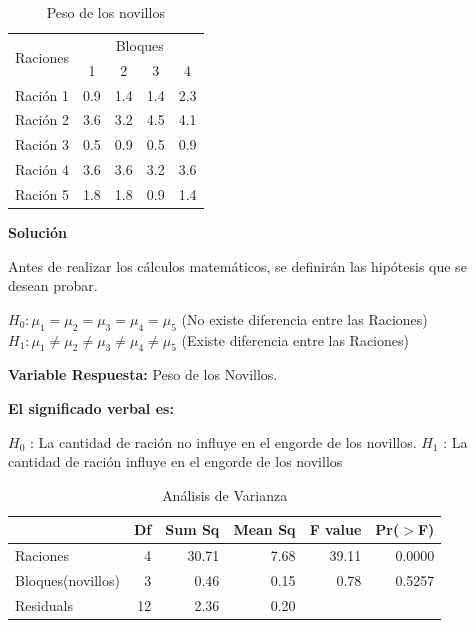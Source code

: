 \documentclass[12pt,letterpaper]{report}
\begin{document}
\begin{table}[htb]
\centering
\begin{tabular}{||c|c|c|c|c||}
\hline
\hline
\multirow{2}{*}{Raciones}  & \multicolumn{4}{|c||}{Bloques} \\
\cline{2-5}
     &1&2&3&4 \\
\hline
Ración 1 &0.9&1.4&1.4&2.3 \\
\hline
Ración 2 &3.6&3.2&4.5&4.1 \\
\hline
Ración 3 &0.5&0.9&0.5&0.9 \\
\hline
Ración 4 &3.6&3.6&3.2&3.6 \\
\hline
Ración 5 &1.8&1.8&0.9&1.4 \\
\hline
\hline

\end{tabular}
\caption{Peso de los novillos}
\end{table}

\textbf{Solución}

Antes de realizar los cálculos matemáticos, se definirán las hipótesis que se desean probar.

$H_0 : \mu_1 = \mu_2 = \mu_3 = \mu_4 = \mu_5$ (No existe diferencia entre las Raciones)
$H_1 : \mu_1 \not= \mu_2 \not= \mu_3 \not= \mu_4 \not= \mu_5$ (Existe diferencia entre las Raciones)

\textbf{Variable Respuesta:} Peso de los Novillos.

\textbf{El significado verbal es:}

$H_0$ : La cantidad de ración no influye en el engorde de los novillos.
$H_1$ : La cantidad de ración influye en el engorde de los novillos


\begin{Schunk}
\end{Schunk}

\begin{table}[ht]
\centering
\begin{tabular}{lrrrrr}
  \hline
 & Df & Sum Sq & Mean Sq & F value & Pr($>$F) \\ 
  \hline
Raciones & 4 & 30.71 & 7.68 & 39.11 & 0.0000 \\ 
Bloques(novillos) & 3 & 0.46 & 0.15 & 0.78 & 0.5257 \\ 
  Residuals & 12 & 2.36 & 0.20 &  &  \\ 
   \hline
\end{tabular}
\caption{Análisis de Varianza}
\end{table}
\end{document}
